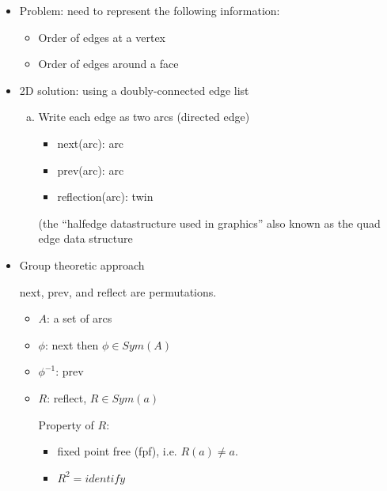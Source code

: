 \documentclass[12pt]{article}
\begin{document}
\begin{itemize}
\item Problem: need to represent the following information:
  \begin{itemize}
  \item Order of edges at a vertex
  \item Order of edges around a face
  \end{itemize}
\item 2D solution: using a doubly-connected edge list
  \begin{enumerate}[a)]
  \item Write each edge as two arcs (directed edge)
    \begin{itemize}
    \item next(arc): arc
    \item prev(arc): arc
    \item reflection(arc): twin
    \end{itemize}
    (the ``halfedge datastructure used in graphics''
    also known as the quad edge data structure
  \end{enumerate}
\item Group theoretic approach
  
  next, prev, and reflect are permutations.
  \begin{itemize}
  \item $A$: a set of arcs
  \item $\phi$: next then $\phi \in Sym(A)$
  \item $\phi^{-1}$: prev
  \item $R$: reflect, $R \in Sym(a)$
    
    Property of $R$: 
    \begin{itemize}
    \item fixed point free (fpf), i.e. $R(a) \neq a$.
    \item $R^2 = identify$
    \end{itemize}

  \end{itemize}
\end{itemize}
\end{document}
